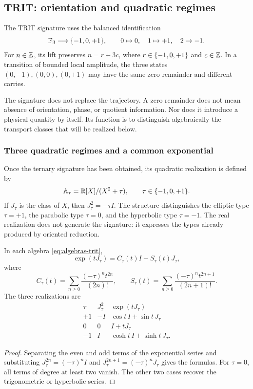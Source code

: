 \subsection{TRIT: orientation and quadratic regimes}

\begin{definition}
The TRIT signature uses the balanced identification
\[
 \mathbb F_3\longrightarrow\{-1,0,+1\},\qquad 0\mapsto0,\quad1\mapsto+1,\quad2\mapsto-1.
\]
For \(n\in\mathbb Z\), its lift preserves \(n=r+3c\), where \(r\in\{-1,0,+1\}\) and \(c\in\mathbb Z\). In a transition of bounded local amplitude, the three states \((0,-1),(0,0),(0,+1)\) may have the same zero remainder and different carries.
\end{definition}

The signature does not replace the trajectory. A zero remainder does not mean absence of orientation, phase, or quotient information. Nor does it introduce a physical quantity by itself. Its function is to distinguish algebraically the transport classes that will be realized below.

\subsubsection{Three quadratic regimes and a common exponential}

Once the ternary signature has been obtained, its quadratic realization is defined by
\begin{equation}
 \mathbb A_\tau=\mathbb R[X]/(X^2+\tau),\qquad \tau\in\{-1,0,+1\}.
 \label{eq:algebras-trit}
\end{equation}
If \(J_\tau\) is the class of \(X\), then \(J_\tau^2=-\tau I\). The structure distinguishes the elliptic type \(\tau=+1\), the parabolic type \(\tau=0\), and the hyperbolic type \(\tau=-1\). The real realization does not generate the signature: it expresses the types already produced by oriented reduction.

\begin{proposition}
In each algebra \eqref{eq:algebras-trit},
\begin{equation}
 \exp(tJ_\tau)=C_\tau(t)I+S_\tau(t)J_\tau,
\end{equation}
where
\[
 C_\tau(t)=\sum_{n\ge0}\frac{(-\tau)^nt^{2n}}{(2n)!},\qquad
 S_\tau(t)=\sum_{n\ge0}\frac{(-\tau)^nt^{2n+1}}{(2n+1)!}.
\]
The three realizations are
\[
 \begin{array}{c|c|c}
 \tau&J_\tau^2&\exp(tJ_\tau)\\\hline
 +1&-I&\cos t\,I+\sin t\,J_\tau\\
 0&0&I+tJ_\tau\\
 -1&I&\cosh t\,I+\sinh t\,J_\tau.
 \end{array}
\]
\end{proposition}
\begin{proof}
Separating the even and odd terms of the exponential series and substituting \(J_\tau^{2n}=(-\tau)^nI\) and \(J_\tau^{2n+1}=(-\tau)^nJ_\tau\) gives the formulas. For \(\tau=0\), all terms of degree at least two vanish. The other two cases recover the trigonometric or hyperbolic series.
\end{proof}


